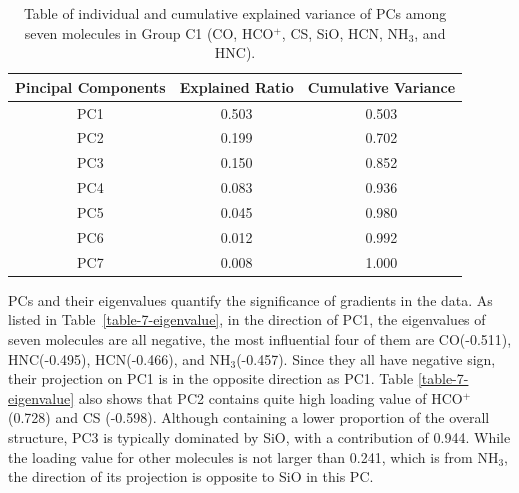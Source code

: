 \documentclass{aa}
\begin{document}
\begin{CJK*}{UTF8}{gbsn}
\begin{table}[htbp]
\centering
\begin{tabular}{ccc}
\hline\hline
\multicolumn{1}{l}{Pincipal Components} & \multicolumn{1}{l}{Explained Ratio} & Cumulative Variance \\ \hline
PC1                                     & 0.503                               & 0.503               \\
PC2                                     & 0.199                               & 0.702               \\
PC3                                     & 0.150                               & 0.852               \\
PC4                                     & 0.083                               & 0.936               \\
PC5                                     & 0.045                               & 0.980               \\
PC6                                     & 0.012                               & 0.992               \\
PC7                                     & 0.008                               & 1.000   \\           \hline\hline
\end{tabular}
\caption{Table of individual and cumulative explained variance of PCs among seven molecules in Group C1 (CO, HCO$^+$, CS, SiO, HCN, NH$_3$, and HNC).}
\label{table-cloud-1}
\end{table}
   
   PCs and their eigenvalues quantify the significance of gradients in the data. 
   As listed in Table~\ref{table-7-eigenvalue}, in the direction of PC1, the eigenvalues of seven molecules are all negative, the most influential four of them are CO(-0.511), HNC(-0.495), HCN(-0.466), and NH$_3$(-0.457).
   Since they all have negative sign, their projection on PC1 is in the opposite direction as PC1.
   Table \ref{table-7-eigenvalue} also shows that PC2 contains quite high loading value of HCO$^+$ (0.728) and CS (-0.598). 
   Although containing a lower proportion of the overall structure, PC3 is typically dominated by SiO, with a contribution of 0.944.
   While the loading value for other molecules is not larger than 0.241, which is from NH$_3$, the direction of its projection is opposite to SiO in this PC.




\end{CJK*}
\end{document}
